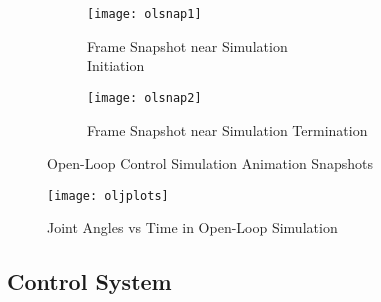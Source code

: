 \begin{figure}[htp]
  \center
  \begin{subfigure}[c]{0.5\textwidth}
  \center
  \texttt{[image: olsnap1]}
  \caption{Frame Snapshot near Simulation \\Initiation}
\end{subfigure}%
\begin{subfigure}[c]{0.5\textwidth}
  \center
  \texttt{[image: olsnap2]}
  \caption{Frame Snapshot near Simulation Termination}
\end{subfigure}
  \caption{Open-Loop Control Simulation Animation Snapshots}
  \label{fig:olsnaps}
\end{figure}


\begin{figure}[htp]
  \center
  \texttt{[image: oljplots]}
  \caption{Joint Angles vs Time in Open-Loop Simulation}
  \label{fig:oljplots}
\end{figure}

\newpage
\subsection{Control System}
\newpage

